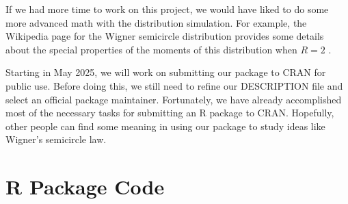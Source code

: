 \documentclass[11pt]{asaproc}
\begin{document}
If we had more time to work on this project, we would have liked to do some more advanced math with the distribution simulation. For example, the Wikipedia page for the Wigner semicircle distribution provides some details about the special properties of the moments of this distribution when $R=2$ \citep{wikimedia_wigner}.

Starting in May 2025, we will work on submitting our package to CRAN for public use. Before doing this, we still need to refine our DESCRIPTION file and select an official package maintainer. Fortunately, we have already accomplished most of the necessary tasks for submitting an R package to CRAN. Hopefully, other people can find some meaning in using our package to study ideas like Wigner's semicircle law.




%

{\footnotesize
}

\appendix
\section{R Package Code}
\end{document}
